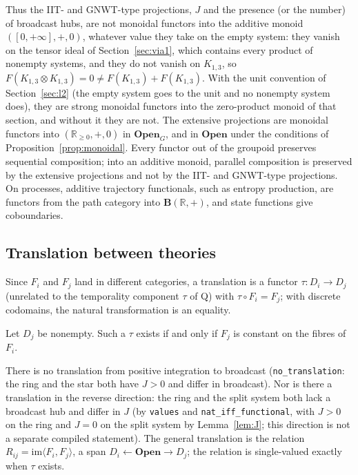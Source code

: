Thus the IIT- and GNWT-type projections, $J$ and the presence (or the number) of broadcast hubs, are not monoidal functors into the additive monoid $([0,+\infty],+,0)$, whatever value they take on the empty system: they vanish on the tensor ideal of Section~\ref{sec:via1}, which contains every product of nonempty systems, and they do not vanish on $K_{1,3}$, so $F(K_{1,3}\otimes K_{1,3})=0\ne F(K_{1,3})+F(K_{1,3})$. With the unit convention of Section~\ref{sec:l2} (the empty system goes to the unit and no nonempty system does), they are strong monoidal functors into the zero-product monoid of that section, and without it they are not. The extensive projections are monoidal functors into $(\mathbb R_{\ge0},+,0)$ in $\mathbf{Open}_G$, and in $\mathbf{Open}$ under the conditions of Proposition~\ref{prop:monoidal}. Every functor out of the groupoid preserves sequential composition; into an additive monoid, parallel composition is preserved by the extensive projections and not by the IIT- and GNWT-type projections. On processes, additive trajectory functionals, such as entropy production, are functors from the path category into $\mathbf B(\mathbb R,+)$, and state functions give coboundaries.

\subsection{Translation between theories}\label{sec:traduccion}
Since $F_i$ and $F_j$ land in different categories, a translation is a functor $\tau:D_i\to D_j$ (unrelated to the temporality component $\tau$ of Q) with $\tau\circ F_i=F_j$; with discrete codomains, the natural transformation is an equality.
\begin{theorem}\label{thm:translation}
Let $D_j$ be nonempty. Such a $\tau$ exists if and only if $F_j$ is constant on the fibres of $F_i$.
\end{theorem}
There is no translation from positive integration to broadcast (\texttt{no\_translation}: the ring and the star both have $J>0$ and differ in broadcast). Nor is there a translation in the reverse direction: the ring and the split system both lack a broadcast hub and differ in $J$ (by \texttt{values} and \texttt{nat\_iff\_functional}, with $J>0$ on the ring and $J=0$ on the split system by Lemma~\ref{lem:J}; this direction is not a separate compiled statement). The general translation is the relation $R_{ij}=\mathrm{im}\langle F_i,F_j\rangle$, a span $D_i\leftarrow\mathbf{Open}\to D_j$; the relation is single-valued exactly when $\tau$ exists.

